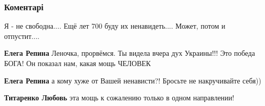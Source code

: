  
 
 
 
 
\subsubsection{Коментарі}
\label{sec:28_07_2021.fb.titarenko_lubov.1.a_ty_svoboden.cmt}

\begin{itemize}
 
Я - не свободна....
Ещё лет 700 буду их ненавидеть....
Может, потом и отпустит....

\begin{itemize}
 
\textbf{Елега Репина} Леночка, прорвёмся. Ты видела вчера дух Украины!!! Это победа БОГА! Он показал нам, какая мощь ЧЕЛОВЕК 🙏

 
\textbf{Елега Репина} а кому хуже от Вашей ненависти?! Бросьте не накручивайте себя))

 
\textbf{Титаренко Любовь} эта мощь к сожалению только в одном направлении!

 

\end{itemize}
\end{itemize}
